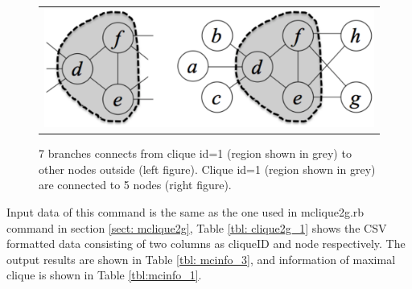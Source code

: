 \begin{figure}[htbp]
\begin{center}
\begin{tabular}{c}

\begin{minipage}{0.5\hsize}
\begin{center}
\includegraphics[scale=0.3]{./mcinfo_3.eps}
\caption{7 branches connects from clique id=1 (region shown in grey) to other nodes outside (left figure). 
Clique id=1 (region shown in grey) are connected to 5 nodes (right figure).
\label{fig:mcinfo_3}}
\end{center}
\end{minipage}

\end{tabular} 
\end{center}
\end{figure} 

Input data of this command is the same as the one used in mclique2g.rb command in section \ref{sect: mclique2g}, Table \ref{tbl: clique2g_1} shows the CSV formatted data consisting of two columns as cliqueID and node respectively. 
The output results are shown in Table \ref{tbl: mcinfo_3}, and information of maximal clique is shown in Table \ref{tbl:mcinfo_1}. 


